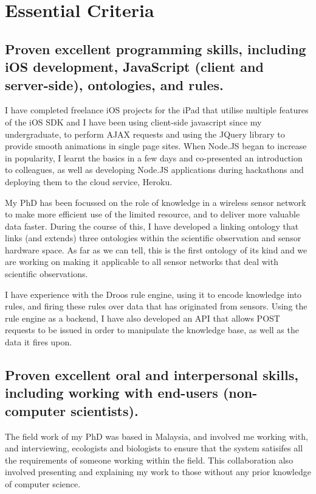 \documentclass[10pt,a4paper]{article}
\begin{document}
\section{Essential Criteria}
\subsection{Proven excellent programming skills, including iOS development, JavaScript (client and server-side), ontologies, and rules.}
I have completed freelance iOS projects for the iPad that utilise multiple features of the iOS SDK and I have been using client-side javascript since my undergraduate, to perform AJAX requests and using the JQuery library to provide smooth animations in single page sites. When Node.JS began to increase in popularity, I learnt the basics in a few days and co-presented an introduction to colleagues, as well as developing Node.JS applications during hackathons and deploying them to the cloud service, Heroku. 

My PhD has been focussed on the role of knowledge in a wireless sensor network to make more efficient use of the limited resource, and to deliver more valuable data faster. During the course of this, I have developed a linking ontology that links (and extends) three ontologies within the scientific observation and sensor hardware space. As far as we can tell, this is the first ontology of its kind and we are working on making it applicable to all sensor networks that deal with scientific observations.

I have experience with the Droos rule engine, using it to encode knowledge into rules, and firing these rules over data that has originated from sensors. Using the rule engine as a backend, I have also developed an API that allows POST requests to be issued in order to manipulate the knowledge base, as well as the data it fires upon.

\subsection{Proven excellent oral and interpersonal skills, including working with end-users (non-computer scientists).}
The field work of my PhD was based in Malaysia, and involved me working with, and interviewing, ecologists and biologists to ensure that the system satisifes all the requirements of someone working within the field. This collaboration also involved presenting and explaining my work to those without any prior knowledge of computer science.
\end{document}
